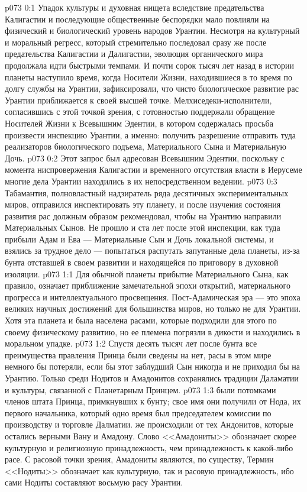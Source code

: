 \vs p073 0:1 Упадок культуры и духовная нищета вследствие предательства Калигастии и последующие общественные беспорядки мало повлияли на физический и биологический уровень народов Урантии. Несмотря на культурный и моральный регресс, который стремительно последовал сразу же после предательства Калигастии и Далигастии, эволюция органического мира продолжала идти быстрыми темпами. И почти сорок тысяч лет назад в истории планеты наступило время, когда Носители Жизни, находившиеся в то время по долгу службы на Урантии, зафиксировали, что чисто биологическое развитие рас Урантии приближается к своей высшей точке. Мелхиседеки\hyp{}исполнители, согласившись с этой точкой зрения, с готовностью поддержали обращение Носителей Жизни к Всевышним Эдентии, в котором содержалась просьба произвести инспекцию Урантии, а именно: получить разрешение отправить туда реализаторов биологического подъема, Материального Сына и Материальную Дочь.
\vs p073 0:2 Этот запрос был адресован Всевышним Эдентии, поскольку с момента ниспровержения Калигастии и временного отсутствия власти в Иерусеме многие дела Урантии находились в их непосредственном ведении.
\vs p073 0:3 Табамантия, полновластный надзиратель ряда десятичных экспериментальных миров, отправился инспектировать эту планету, и после изучения состояния развития рас должным образом рекомендовал, чтобы на Урантию направили Материальных Сынов. Не прошло и ста лет после этой инспекции, как туда прибыли Адам и Ева --- Материальные Сын и Дочь локальной системы, и взялись за трудное дело --- попытаться распутать запутанные дела планеты, из\hyp{}за бунта отставшей в своем развитии и находящейся по приговору в духовной изоляции.
\vs p073 1:1 Для обычной планеты прибытие Материального Сына, как правило, означает приближение замечательной эпохи открытий, материального прогресса и интеллектуального просвещения. Пост\hyp{}Адамическая эра --- это эпоха великих научных достижений для большинства миров, но только не для Урантии. Хотя эта планета и была населена расами, которые подходили для этого по своему физическому развитию, но ее племена погрязли в дикости и находились в моральном упадке.
\vs p073 1:2 Спустя десять тысяч лет после бунта все преимущества правления Принца были сведены на нет, расы в этом мире немного бы потеряли, если бы этот заблудший Сын никогда и не приходил бы на Урантию. Только среди Нодитов и Амадонитов сохранялись традиции Даламатии и культуры, связанной с Планетарным Принцем.
\vs p073 1:3  были потомками членов штата Принца, примкнувших к бунту; свое имя они получили от Нода, их первого начальника, который одно время был председателем комиссии по производству и торговле Далматии.  же происходили от тех Андонитов, которые остались верными Вану и Амадону. Слово <<Амадониты>> обозначает скорее культурную и религиозную принадлежность, чем принадлежность к какой\hyp{}либо расе. С расовой точки зрения, Амадониты являются, по существу,  Термин <<Нодиты>> обозначает как культурную, так и расовую принадлежность, ибо сами Нодиты составляют восьмую расу Урантии.
